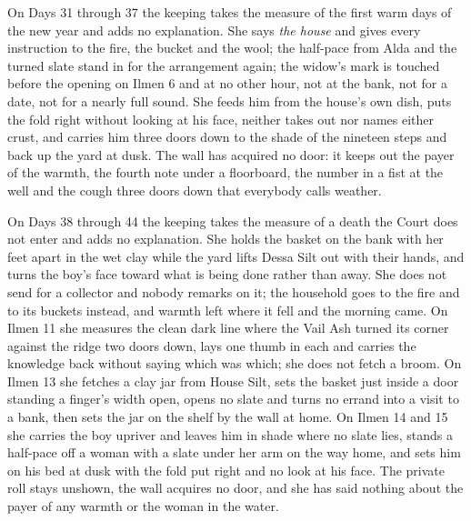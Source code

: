 \documentclass{design/chronicle}
\begin{document}
{On Days 31 through 37 the keeping takes the measure of the first warm days of the new year and adds no explanation. She says \emph{the house} and gives every instruction to the fire, the bucket and the wool; the half-pace from Alda and the turned slate stand in for the arrangement again; the widow’s mark is touched before the opening on Ilmen 6 and at no other hour, not at the bank, not for a date, not for a nearly full sound. She feeds him from the house’s own dish, puts the fold right without looking at his face, neither takes out nor names either crust, and carries him three doors down to the shade of the nineteen steps and back up the yard at dusk. The wall has acquired no door: it keeps out the payer of the warmth, the fourth note under a floorboard, the number in a fist at the well and the cough three doors down that everybody calls weather.

On Days 38 through 44 the keeping takes the measure of a death the Court does not enter and adds no explanation. She holds the basket on the bank with her feet apart in the wet clay while the yard lifts Dessa Silt out with their hands, and turns the boy’s face toward what is being done rather than away. She does not send for a collector and nobody remarks on it; the household goes to the fire and to its buckets instead, and warmth left where it fell and the morning came. On Ilmen 11 she measures the clean dark line where the Vail Ash turned its corner against the ridge two doors down, lays one thumb in each and carries the knowledge back without saying which was which; she does not fetch a broom. On Ilmen 13 she fetches a clay jar from House Silt, sets the basket just inside a door standing a finger’s width open, opens no slate and turns no errand into a visit to a bank, then sets the jar on the shelf by the wall at home. On Ilmen 14 and 15 she carries the boy upriver and leaves him in shade where no slate lies, stands a half-pace off a woman with a slate under her arm on the way home, and sets him on his bed at dusk with the fold put right and no look at his face. The private roll stays unshown, the wall acquires no door, and she has said nothing about the payer of any warmth or the woman in the water.

}
\end{document}

